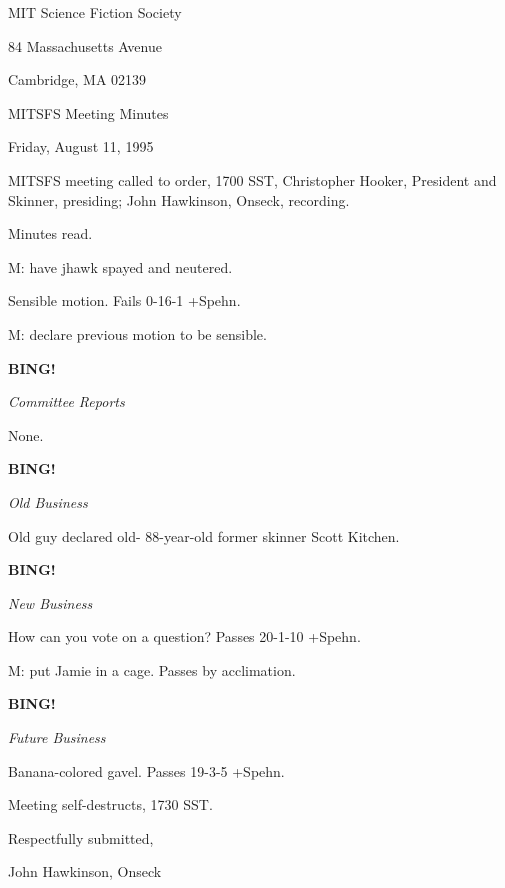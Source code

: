 \documentclass[12pt]{article}
\newcommand{\bing}{{\bf BING!} }
\newcommand{\goto}[1]{\bing \vskip 12pt \centerline{{\em{#1}}}}
\begin{document}
\begin{center}

MIT Science Fiction Society 

84 Massachusetts Avenue

Cambridge, MA 02139

\vspace{12pt}

MITSFS Meeting Minutes 

Friday, August 11, 1995

\end{center}
 
\vspace{18pt}

\setlength{\parskip}{6pt}

\noindent
MITSFS meeting called to order, 1700 SST,
Christopher Hooker, President and Skinner, presiding; John Hawkinson, Onseck, recording.

Minutes read.

M: have jhawk spayed and neutered.

Sensible motion. Fails 0-16-1 +Spehn.

M: declare previous motion to be sensible.

\goto{Committee Reports}

None.

\goto{Old Business}

Old guy declared old- 88-year-old former skinner Scott Kitchen.

\goto{New Business}

How can you vote on a question? Passes 20-1-10 +Spehn.

M: put Jamie in a cage. Passes by acclimation.

\goto{Future Business}

Banana-colored gavel. Passes 19-3-5 +Spehn.

\vspace{12pt}

\noindent
Meeting self-destructs, 1730 SST.

\vspace{18pt}

\centerline{Respectfully submitted,}
\centerline{John Hawkinson, Onseck}
\end{document}
